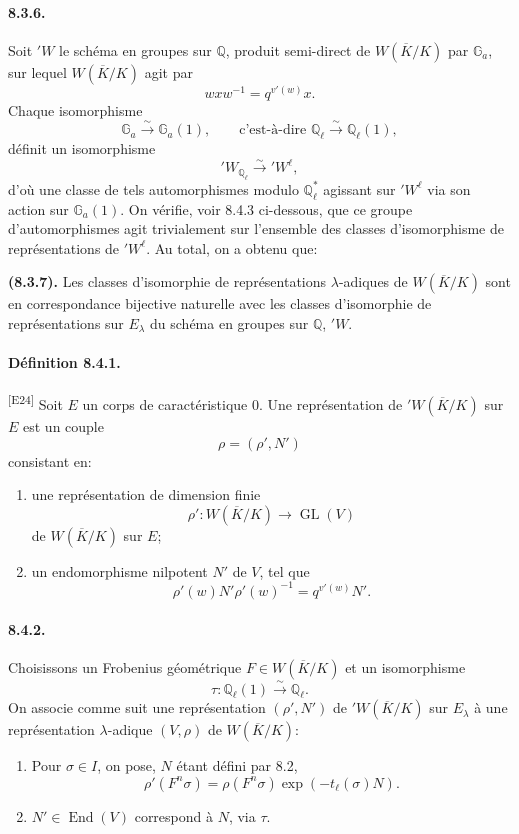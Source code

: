 \documentclass[10pt,letterpaper]{article}
\newcommand{\GL}{\operatorname{GL}}
\newcommand{\iso}{\xrightarrow{\sim}}
\providecommand{\GL}{\operatorname{GL}}
\providecommand{\End}{\operatorname{End}}
\providecommand{\GL}{\operatorname{GL}}
\providecommand{\End}{\operatorname{End}}
\newcommand{\auditmark}[1]{\textsuperscript{\normalfont\scriptsize[E#1]}}
\begin{document}
\paragraph{8.3.6.} Soit \({}'W\) le schéma en groupes sur \(\mathbb Q\), produit semi-direct de \(W(\overline K/K)\) par \(\mathbb G_a\), sur lequel \(W(\overline K/K)\) agit par
\[
w x w^{-1}=q^{v'(w)}x.
\]
Chaque isomorphisme
\[
\mathbb G_a\iso\mathbb G_a(1),
\qquad\text{c'est-à-dire }\mathbb Q_\ell\iso\mathbb Q_\ell(1),
\]
définit un isomorphisme
\[
{}'W_{\mathbb Q_\ell}\iso{}'W^\ell,
\]
d'où une classe de tels automorphismes modulo \(\mathbb Q_\ell^*\) agissant sur \({}'W^\ell\) via son action sur \(\mathbb G_a(1)\). On vérifie, voir 8.4.3 ci-dessous, que ce groupe d'automorphismes agit trivialement sur l'ensemble des classes d'isomorphisme de représentations de \({}'W^\ell\). Au total, on a obtenu que:

\noindent\textbf{(8.3.7).} Les classes d'isomorphie de représentations \(\lambda\)-adiques de \(W(\overline K/K)\) sont en correspondance bijective naturelle avec les classes d'isomorphie de représentations sur \(E_\lambda\) du schéma en groupes sur \(\mathbb Q\), \({}'W\).

\paragraph{Définition 8.4.1.}\auditmark{24} Soit \(E\) un corps de caractéristique \(0\). Une représentation de \({}'W(\overline K/K)\) sur \(E\) est un couple
\[
\rho=(\rho',N')
\]
consistant en:
\begin{enumerate}[label=(\alph*)]
\item une représentation de dimension finie
\[
\rho':W(\overline K/K)\longrightarrow \GL(V)
\]
de \(W(\overline K/K)\) sur \(E\);
\item un endomorphisme nilpotent \(N'\) de \(V\), tel que
\[
\tag{8.4.1.1}
\rho'(w)N'\rho'(w)^{-1}=q^{v'(w)}N'.
\]
\end{enumerate}

\paragraph{8.4.2.} Choisissons un Frobenius géométrique \(F\in W(\overline K/K)\) et un isomorphisme
\[
\tau:\mathbb Q_\ell(1)\iso\mathbb Q_\ell.
\]
On associe comme suit une représentation \((\rho',N')\) de \({}'W(\overline K/K)\) sur \(E_\lambda\) à une représentation \(\lambda\)-adique \((V,\rho)\) de \(W(\overline K/K)\):
\begin{enumerate}[label=(\alph*)]
\item Pour \(\sigma\in I\), on pose, \(N\) étant défini par 8.2,
\[
\rho'(F^n\sigma)=\rho(F^n\sigma)\exp(-t_\ell(\sigma)N).
\]
\item \(N'\in\End(V)\) correspond à \(N\), via \(\tau\).
\end{enumerate}
\end{document}
